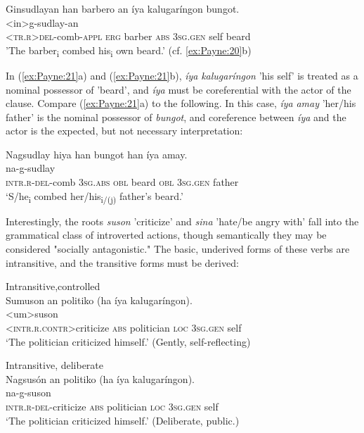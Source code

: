 \documentclass[output=paper]{langscibook}
\begin{document}
\ex
\glll
 {Ginsudlayan} {han} {barbero} {an} {íya} {kalugaríngon} {bungot.}\\
 <in>g-sudlay-an { } { } { } { } { } { }\\
 \textsc{<tr.r}>\textsc{del-}comb-\textsc{appl} \textsc{erg} barber \textsc{abs} 3\textsc{sg.gen} self beard\\
 \glt'The barber\textsubscript{i} combed his\textsubscript{i} own beard.' (cf. \ref{ex:Payne:20}b)
 \z
 \z

In (\ref{ex:Payne:21}a) and (\ref{ex:Payne:21}b), \textit{íya} \textit{kalugaríngon} 'his self' is treated as a nominal possessor of 'beard', and \textit{íya} must be coreferential with the actor of the clause. Compare (\ref{ex:Payne:21}a) to the following. In this case, \textit{íya} \textit{amay} 'her/his father' is the nominal possessor of \textit{bungot}, and coreference between \textit{íya} and the actor is the expected, but not necessary interpretation:

\ea
\label{ex:Payne:22}
\glll
Nagsudlay hiya han bungot han íya amay.\\
na-g-sudlay { } { } { } { } { } { } \\
\textsc{intr.r-del}-comb 3\textsc{sg.abs} \textsc{obl} beard \textsc{obl} 3\textsc{sg.gen} father\\
\glt ‘S/he\textsubscript{i} combed her/his\textsubscript{i/(j)} father's beard.'
\z

Interestingly, the roots \textit{suson} 'criticize' and \textit{sina} 'hate/be angry with' fall into the grammatical class of introverted actions, though semantically they may be considered "socially antagonistic." The basic, underived forms of these verbs are intransitive, and the transitive forms must be derived:

\ea
Intransitive,controlled\\
\label{ex:Payne:23}
\ea
\glll
Sumuson an politiko (ha íya kalugaríngon). \\
<um>suson { } { } { } { } { } \\
 <\textsc{intr.r.contr>}criticize \textsc{abs} politician \textsc{loc} 3\textsc{sg.gen} self\\
 \glt ‘The politician criticized himself.' (Gently, self-reflecting)
 
\ex
Intransitive, deliberate\\
\glll
Nagsusón an politiko (ha íya kalugaríngon).\\
na-g-suson { } { } { } { } { } \\
 \textsc{intr.r}{}-\textsc{del}{}-criticize \textsc{abs} politician \textsc{loc} 3\textsc{sg.gen} self\\
\glt ‘The politician criticized himself.' (Deliberate, public.)
\end{document}

